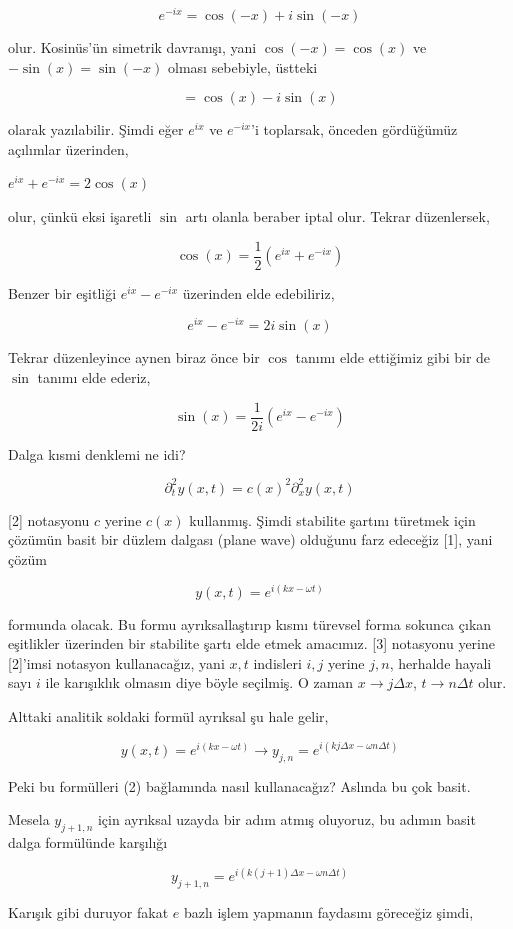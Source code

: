\documentclass[12pt,fleqn]{article}\usepackage{../../common}
\begin{document}
$$
e^{-ix} = \cos (-x) + i\sin(-x)
$$

olur. Kosinüs'ün simetrik davranışı, yani $\cos(-x)=\cos(x)$ ve
$-\sin(x)=\sin(-x)$ olması sebebiyle, üstteki 

$$
= \cos(x) - i\sin(x)
$$

olarak yazılabilir. Şimdi eğer $e^{ix}$ ve $e^{-ix}$'i toplarsak, önceden
gördüğümüz açılımlar üzerinden,

$
e^{ix} + e^{-ix} = 2\cos(x)
$

olur, çünkü eksi işaretli $\sin$ artı olanla beraber iptal olur. Tekrar
düzenlersek,

$$
\cos(x) = \frac{1}{2} (e^{ix} + e^{-ix})
$$

Benzer bir eşitliği $e^{ix} - e^{-ix}$ üzerinden elde edebiliriz,

$$
e^{ix} - e^{-ix} = 2i\sin(x)
$$

Tekrar düzenleyince aynen biraz önce bir $\cos$ tanımı elde ettiğimiz gibi
bir de $\sin$ tanımı elde ederiz,

$$
\sin(x) = \frac{1}{2i} (e^{ix} - e^{-ix})
$$

Dalga kısmi denklemi ne idi?

$$
\partial_t^2 y(x,t) = c(x)^2 \partial_x^2 y(x,t)
$$

[2] notasyonu $c$ yerine $c(x)$ kullanmış. Şimdi stabilite şartını türetmek için
çözümün basit bir düzlem dalgası (plane wave) olduğunu farz edeceğiz [1], yani
çözüm

$$
y(x,t) = e^{i(kx-\omega t)}
$$

formunda olacak. Bu formu ayrıksallaştırıp kısmı türevsel forma sokunca çıkan
eşitlikler üzerinden bir stabilite şartı elde etmek amacımız. [3] notasyonu
yerine [2]'imsi notasyon kullanacağız, yani $x,t$ indisleri $i,j$ yerine $j,n$,
herhalde hayali sayı $i$ ile karışıklık olmasın diye böyle seçilmiş. O zaman $x
\to j \Delta x$, $t \to n \Delta t$ olur.

Alttaki analitik soldaki formül ayrıksal şu hale gelir,

$$
y(x,t) = e^{i(kx - \omega t)} \to
y_{j,n} = e^{i(kj\Delta x - \omega n \Delta t)}
$$

Peki bu formülleri (2) bağlamında nasıl kullanacağız? Aslında bu çok basit.

Mesela $y_{j+1,n}$ için ayrıksal uzayda bir adım atmış oluyoruz, bu adımın
basit dalga formülünde karşılığı

$$
y_{j+1,n} = e^{i ( k(j+1)\Delta x - \omega n \Delta t )}
$$

Karışık gibi duruyor fakat $e$ bazlı işlem yapmanın faydasını göreceğiz şimdi,
\end{document}
